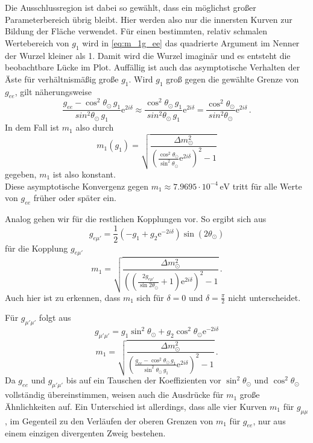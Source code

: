 Die Ausschlussregion ist dabei so gewählt, dass ein möglichst großer Parameterbereich übrig bleibt.
Hier werden also nur die innersten Kurven zur Bildung der Fläche verwendet.
Für einen bestimmten, relativ schmalen Wertebereich von $g_1$ wird in \eqref{eq:m_1g_ee} das quadrierte Argument im Nenner der Wurzel kleiner als 1.
Damit wird die Wurzel imaginär und es entsteht die beobachtbare Lücke im Plot.
Auffällig ist auch das asymptotische Verhalten der Äste für verhältnismäßig große $g_1$.
Wird $g_1$ groß gegen die gewählte Grenze von $g_{ee}$, gilt näherungsweise 
\begin{equation*}
    \frac{g_{ee} -  \cos^2 \theta_\odot \, g_1}{sin^2 \theta_\odot \, g_1} \mathrm{e}^{2 i \delta} \approx \frac{\cos^2 \theta_\odot \, g_1}{sin^2 \theta_\odot \, g_1} \mathrm{e}^{2 i \delta}
    = \frac{\cos^2 \theta_\odot}{sin^2 \theta_\odot} \mathrm{e}^{2 i \delta} \,.
\end{equation*}
In dem Fall ist $m_1$ also durch
\begin{equation*}
    m_1 (g_1) = \sqrt{\frac{\Delta m^2_\odot}{ \left(\frac{\cos^2 \theta_\odot}{\sin^2 \theta_\odot} \mathrm{e}^{2 i \delta}\right)^2 - 1}}
\end{equation*}
gegeben, $m_1$ ist also konstant. \\
Diese asymptotische Konvergenz gegen $m_1 \approx \num{7.9695} \cdot 10^{-4} \, \si{\eV}$ tritt für alle Werte von $g_{ee}$ früher oder später ein.

Analog gehen wir für die restlichen Kopplungen vor.
So ergibt sich aus
\begin{equation*}
    g_{e \mu'} = \frac{1}{2} \left(-g_1 + g_2 \mathrm{e}^{-2 i \delta}\right) \sin(2 \theta_\odot)
\end{equation*}
für die Kopplung $g_{e \mu'}$
\begin{equation}
    m_1 = \sqrt{\frac{\Delta m^2_\odot}{\left( \left(\frac{2 g_{e \mu'}}{\sin{2 \theta_\odot}} + 1 \right) \mathrm{e}^{2 i \delta}\right)^2 - 1}} \,.
    \label{eq:g_emu}
\end{equation}
Auch hier ist zu erkennen, dass $m_1$ sich für $\delta = 0$ und $\delta = \frac{\pi}{2}$ nicht unterscheidet.

Für $g_{\mu' \mu'}$ folgt aus
\begin{equation*}
    g_{\mu' \mu'} = g_1 \sin^2 \theta_\odot + g_2 \cos^2 \theta_\odot\mathrm{e}^{-2 i \delta}
\end{equation*}
\begin{equation}
    m_1 = \sqrt{\frac{\Delta m^2_\odot}{\left(\frac{g_{ee} -  \cos^2 \theta_\odot \, g_1}{\sin^2 \theta_\odot \, g_1} \mathrm{e}^{2 i \delta} \right)^2 - 1}} \,.
    \label{eq:m_1g_mumu}
\end{equation}
Da $g_{ee}$ und $g_{\mu' \mu'}$ bis auf ein Tauschen der Koeffizienten vor $\sin^2\theta_\odot$ und $\cos^2\theta_\odot$ vollständig übereinstimmen, weisen auch die Ausdrücke für $m_1$ große Ähnlichkeiten auf.
Ein Unterschied ist allerdings, dass alle vier Kurven $m_1$ für $g_{\mu \mu}$, im Gegenteil zu den Verläufen der oberen Grenzen von $m_1$ für $g_{ee}$, nur aus einem einzigen divergenten Zweig bestehen.


